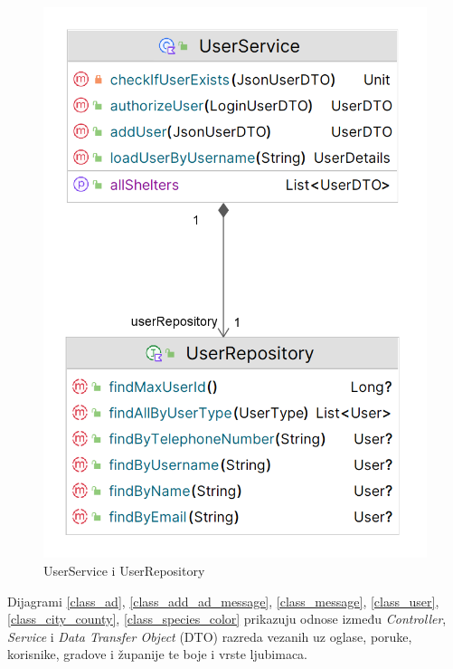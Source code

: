 			\begin{figure}[H]
				\includegraphics[scale=0.35]{slike/class_service_repo.PNG} 
				\centering
				\caption{UserService i UserRepository}
				\label{class_service_repo}
			\end{figure}
			
			Dijagrami \ref{class_ad}, \ref{class_add_ad_message}, \ref{class_message}, \ref{class_user}, \ref{class_city_county}, \ref{class_species_color} prikazuju odnose između \textit{Controller}, \textit{Service} i \textit{Data Transfer Object} (DTO) razreda vezanih uz oglase, poruke, korisnike, gradove i županije te boje i vrste ljubimaca.
			
